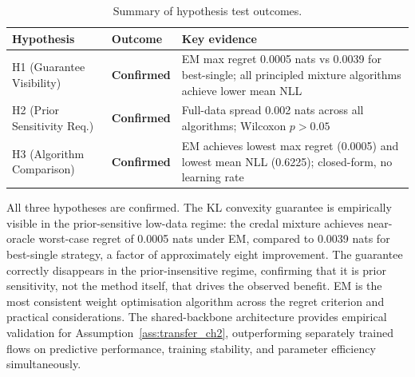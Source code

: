 \begin{table}[h]
\centering
\caption{Summary of hypothesis 
test outcomes.}
\label{tab:hypothesis_summary}
{\singlespacing
\begin{tabular}{p{3.5cm}lp{6.5cm}}
\hline
Hypothesis & Outcome & Key evidence \\
\hline
H1 (Guarantee Visibility) 
& \textbf{Confirmed} 
& EM max regret 0.0005 nats vs 
0.0039 for best-single; all 
principled mixture algorithms 
achieve lower mean NLL \\[4pt]
H2 (Prior Sensitivity Req.) 
& \textbf{Confirmed} 
& Full-data spread 0.002 nats 
across all algorithms; 
Wilcoxon $p > 0.05$ \\[4pt]
H3 (Algorithm Comparison) 
& \textbf{Confirmed} 
& EM achieves lowest max regret 
(0.0005) and lowest mean NLL 
(0.6225); closed-form, no 
learning rate \\
\hline
\end{tabular}}
\end{table}

All three hypotheses are confirmed. 
The KL convexity guarantee is 
empirically visible in the 
prior-sensitive low-data regime: 
the credal mixture achieves 
near-oracle worst-case regret of 
0.0005 nats under EM, compared 
to 0.0039 nats for best-single 
strategy, a factor of approximately 
eight improvement. The guarantee 
correctly disappears in the 
prior-insensitive regime, confirming 
that it is prior sensitivity, not 
the method itself, that drives the 
observed benefit. EM is the most 
consistent weight optimisation 
algorithm across the regret criterion 
and practical considerations. The 
shared-backbone architecture provides 
empirical validation for 
Assumption~\ref{ass:transfer_ch2}, 
outperforming separately trained 
flows on predictive performance, 
training stability, and parameter 
efficiency simultaneously.